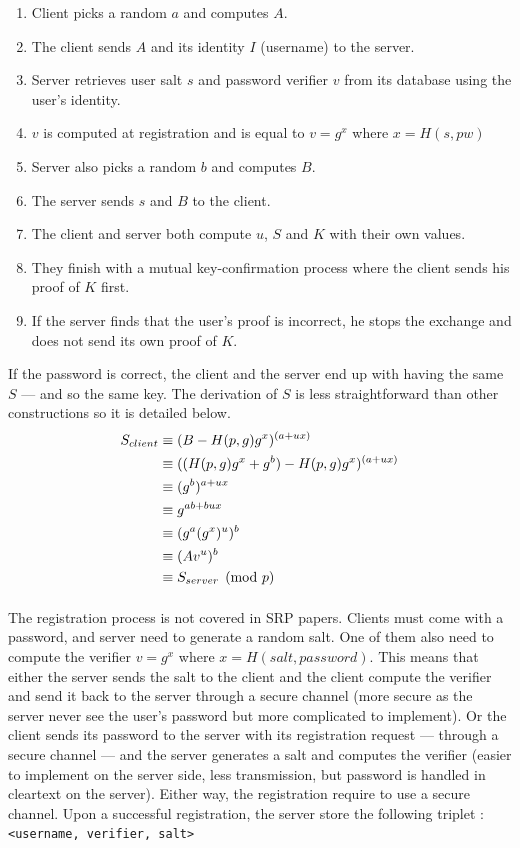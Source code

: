 ﻿\documentclass[../report.tex]{subfiles}
\begin{document}
\begin{enumerate}
 \item Client picks a random $a$ and computes $A$.
 \item The client sends $A$ and its identity $I$ (username) to the server.
 \item Server retrieves user salt $s$ and password verifier $v$ from its database using the user's identity.
 \item $v$ is computed at registration and is equal to $v = g^x$ where $x = H(s, pw)$
 \item Server also picks a random $b$ and computes $B$.
 \item The server sends $s$ and $B$ to the client.
 \item The client and server both compute $u$, $S$ and $K$ with their own values.
 \item They finish with a mutual key-confirmation process where the client sends his proof of $K$ first.
 \item If the server finds that the user's proof is incorrect, he stops the exchange and does not send its own proof of $K$.
\end{enumerate}


If the password is correct, the client and the server end up with having the same $S$ --- and so the same key. The derivation of $S$ is less straightforward than other constructions so it is detailed below.
\begin{align*}
 S_{client}
 &\equiv (B - H(p, g) g^x)^{(a+ux)}\notag\\
 &\equiv ((H(p, g) g^x + g^b) - H(p, g) g^x)^{(a+ux)}\notag\\
 &\equiv (g^b)^{a+ux}\notag\\
 &\equiv g^{ab+bux}\notag\\
 &\equiv (g^a (g^x)^u)^b\notag\\
 &\equiv (Av^u)^b\notag\\
 &\equiv S_{server} \pmod{p}
\end{align*}


\paragraph{}
The registration process is not covered in SRP papers.
Clients must come with a password, and server need to generate a random salt. One of them also need to compute the verifier $v = g^x$ where $x = H(salt, password)$.
This means that either the server sends the salt to the client and the client compute the verifier and send it back to the server through a secure channel (more secure as the server never see the user's password but more complicated to implement).
Or the client sends its password to the server with its registration request --- through a secure channel --- and the server generates a salt and computes the verifier (easier to implement on the server side, less transmission, but password is handled in cleartext on the server).
Either way, the registration require to use a secure channel.
Upon a successful registration, the server store the following triplet : 
\verb|<username, verifier, salt>|
\end{document}
